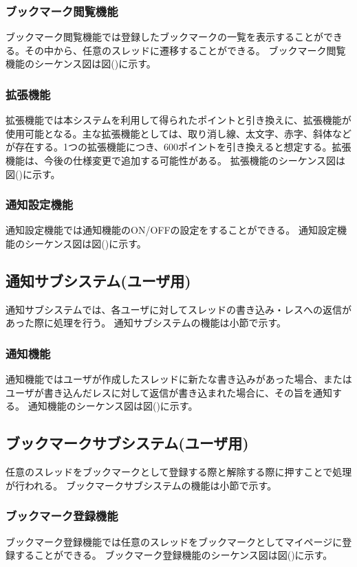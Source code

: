 \documentclass[a4j]{jarticle}
\begin{document}
  \subsubsection{ブックマーク閲覧機能}
  ブックマーク閲覧機能では登録したブックマークの一覧を表示することができる。その中から、任意のスレッドに遷移することができる。
ブックマーク閲覧機能のシーケンス図は図()に示す。
  \subsubsection{拡張機能}
  拡張機能では本システムを利用して得られたポイントと引き換えに、拡張機能が使用可能となる。主な拡張機能としては、取り消し線、太文字、赤字、斜体などが存在する。1つの拡張機能につき、600ポイントを引き換えると想定する。拡張機能は、今後の仕様変更で追加する可能性がある。
拡張機能のシーケンス図は図()に示す。
  \subsubsection{通知設定機能}
  通知設定機能では通知機能のON/OFFの設定をすることができる。
通知設定機能のシーケンス図は図()に示す。


\subsection{通知サブシステム(ユーザ用)}
通知サブシステムでは、各ユーザに対してスレッドの書き込み・レスへの返信があった際に処理を行う。
通知サブシステムの機能は小節で示す。
  \subsubsection{通知機能}
  通知機能ではユーザが作成したスレッドに新たな書き込みがあった場合、またはユーザが書き込んだレスに対して返信が書き込まれた場合に、その旨を通知する。
通知機能のシーケンス図は図()に示す。

\subsection{ブックマークサブシステム(ユーザ用)}
任意のスレッドをブックマークとして登録する際と解除する際に押すことで処理が行われる。
ブックマークサブシステムの機能は小節で示す。
  \subsubsection{ブックマーク登録機能}
  ブックマーク登録機能では任意のスレッドをブックマークとしてマイページに登録することができる。
ブックマーク登録機能のシーケンス図は図()に示す。
\end{document}
